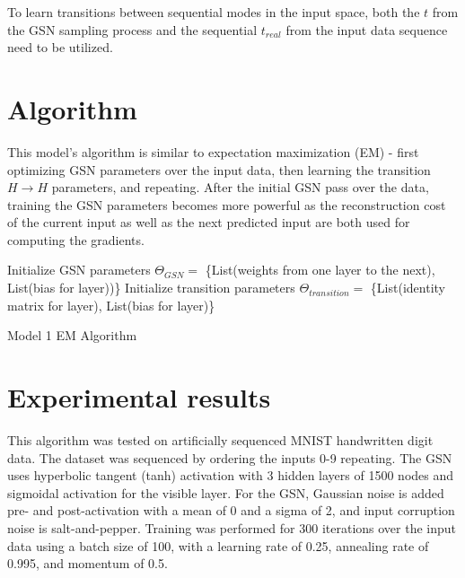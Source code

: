 To learn transitions between sequential modes in the input space, both  the \(t\) from the GSN sampling process and the sequential \(t_{real}\) from the input data sequence need to be utilized.


\section{Algorithm}

This model's algorithm is similar to expectation maximization (EM) - first optimizing GSN parameters over the input data, then learning the transition \(H \rightarrow H\) parameters, and repeating. After the initial GSN pass over the data, training the GSN parameters becomes more powerful as the reconstruction cost of the current input as well as the next predicted input are both used for computing the gradients.

\begin{algorithm}[h!]
	Initialize GSN parameters \(\Theta_{GSN} = \) \{List(weights from one layer to the next), List(bias for layer))\}\;
	Initialize transition parameters \(\Theta_{transition}=\) \{List(identity matrix for layer), List(bias for layer)\} \;
	\caption{ Model 1 EM Algorithm }
\end{algorithm}

\section{Experimental results}

This algorithm was tested on artificially sequenced MNIST handwritten digit data. The dataset was sequenced by ordering the inputs 0-9 repeating. The GSN uses hyperbolic tangent (tanh) activation with 3 hidden layers of 1500 nodes and sigmoidal activation for the visible layer. For the GSN, Gaussian noise is added pre- and post-activation with a mean of 0 and a sigma of 2, and input corruption noise is salt-and-pepper. Training was performed for 300 iterations over the input data using a batch size of 100, with a learning rate of 0.25, annealing rate of 0.995, and momentum of 0.5.

